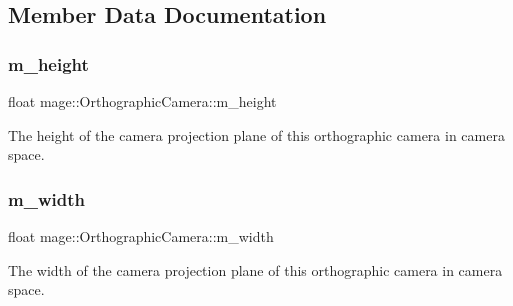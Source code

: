 \subsection{Member Data Documentation}
\hypertarget{classmage_1_1_orthographic_camera_a63169098f604874c1b30c4b276b5a3e1}{}\label{classmage_1_1_orthographic_camera_a63169098f604874c1b30c4b276b5a3e1} 
\subsubsection{\texorpdfstring{m\+\_\+height}{m\_height}}
{\footnotesize\ttfamily float mage\+::\+Orthographic\+Camera\+::m\+\_\+height\hspace{0.3cm}{\ttfamily [private]}}

The height of the camera projection plane of this orthographic camera in camera space. \hypertarget{classmage_1_1_orthographic_camera_aadef4cff19cc1b1ecf427f82bbc3ea6a}{}\label{classmage_1_1_orthographic_camera_aadef4cff19cc1b1ecf427f82bbc3ea6a} 
\subsubsection{\texorpdfstring{m\+\_\+width}{m\_width}}
{\footnotesize\ttfamily float mage\+::\+Orthographic\+Camera\+::m\+\_\+width\hspace{0.3cm}{\ttfamily [private]}}

The width of the camera projection plane of this orthographic camera in camera space. 